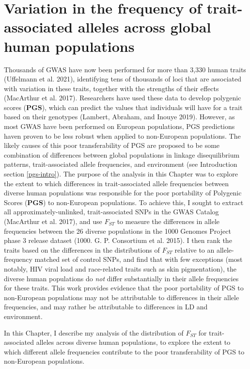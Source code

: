 \documentclass[
]{book}
\begin{document}
\hypertarget{Fst-chap}{%
\chapter{Variation in the frequency of trait-associated alleles across global human populations}\label{Fst-chap}}


Thousands of GWAS have now been performed for more than 3,330 human traits (Uffelmann et al. 2021), identifying tens of thousands of loci that are associated with variation in these traits, together with the strengths of their effects (MacArthur et al. 2017). Researchers have used these data to develop polygenic scores (\textbf{PGS}), which can predict the values that individuals will have for a trait based on their genotypes (Lambert, Abraham, and Inouye 2019). However, as most GWAS have been performed on European populations, PGS predictions haven proven to be less robust when applied to non-European populations. The likely causes of this poor transferability of PGS are proposed to be some combination of differences between global populations in linkage disequilibrium patterns, trait-associated allele frequencies, and environment (see Introduction section \ref{pgs-intro}).
The purpose of the analysis in this Chapter was to explore the extent to which differences in trait-associated allele frequencies between diverse human populations was responsible for the poor portability of Polygenic Scores (\textbf{PGS}) to non-European populations. To achieve this, I sought to extract all approximately-unlinked, trait-associated SNPs in the GWAS Catalog (MacArthur et al. 2017), and use \(F_{ST}\) to measure the differences in allele frequencies between the 26 diverse populations in the 1000 Genomes Project phase 3 release dataset (1000. G. P. Consortium et al. 2015). I then rank the traits based on the differences in the distributions of \(F_{ST}\) relative to an allele-frequency matched set of control SNPs, and find that with few exceptions (most notably, HIV viral load and race-related traits such as skin pigmentation), the diverse human populations do \emph{not} differ substantially in their allele frequencies for these traits. This work provides evidence that the poor portability of PGS to non-European populations may not be attributable to differences in their allele frequencies, and may rather be attributable to differences in LD and environment.

In this Chapter, I describe my analysis of the distribution of \(F_{ST}\) for trait-associated alleles across diverse human populations, to explore the extent to which different allele frequencies contribute to the poor transferability of PGS to non-European populations.
\end{document}
